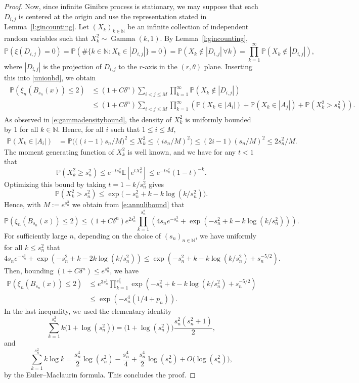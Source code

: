 \documentclass[10pt,a4paper]{amsart}
\def\E{\mathbb E}
\def\P{\mathbb P}
\begin{document}
\begin{proof}
Now, since infinite Ginibre process is stationary, we may suppose that each $D_{i,j}$ is centered at the origin and use the representation  stated in Lemma~\ref{l:gincounting}. Let $(X_k)_{k \in \mathbb{N} }$ be an infinite collection of independent random variables such that $X^2_k\sim \operatorname{Gamma}(k,1)$. By Lemma~\ref{l:gincounting},
\[
\P( \xi ( D_{i,j} ) = 0)  = \P(  \#\{ k \in \mathbb N : X_{k} \in |D_{i,j} | \} =0 ) =  \P (  X_{k} \notin |D_{i,j}| \, \forall k ) =\prod_{k=1}^\infty \P( X_{k} \notin |D_{i,j}|) ,
\]
where $|D_{i,j}|$ is the projection of $D_{i,j}$ to the $r$-axis in the $(r,\theta)$ plane. Inserting this into \eqref{unionbd}, we obtain 
\begin{align}
\begin{split}
\label{e:annulibound}
	\P ( \xi_n ( B_{s_n} (x)) \le 2)
	&\le (1+C\delta^n) \sum_{i < j \le M} 
	\prod_{k=1}^\infty \P( X_{k} \notin |D_{i,j}|)\\
	&\le 
	(1+C\delta^n) \sum_{i < j \le M} 
	\prod_{k=1}^\infty
	\left( \P(X_{k} \in |A_i|) +  \P(X_{k} \in |A_j|) +\P(X^2_{k} > s_n^2) \right).
\end{split}
\end{align}
As observed in \eqref{e:gammadensitybound}, the density of $X^2_{k}$ is uniformly bounded by 1 for all $k \in \mathbb N$. Hence, for all $i$ such that $1 \le i \le M$, 
\begin{align*}
	\P(X_{k}  \in |A_i|)&=\P\Big( \big((i-1)s_n/M\big)^2\le  X^2_{k} \le (is_n/M)^2\Big) \le 
	(2i-1) (s_n/M)^2\le 2s_n^2/M.
\end{align*}
The moment generating function of $X^2_{k}$ is well known, and we have for any $t < 1$ that 
\[
\P( X^2_{k} \ge s_n^2) \le e^{ - t s_n^2} \E [ e^{ t X^2_{k}} ] \le e^{ - t s_n^2}  ( 1 -  t)^{-k}.
\]
Optimizing this bound by taking $t = 1 -  k/s_n^2$ gives 
\[\P(X^2_{k} > s_n^2)\le \exp\big(-s_n^2 +k - k\log ( k/s_n^2)\big).\] 
Hence, with $M:=e^{s_n^3}$ we obtain from \eqref{e:annulibound} that 
\[
\P ( \xi_n ( B_{s_n} (x)) \le 2) \le 
(1+C \delta^n) e^{2 s^3_n} \prod_{k=1}^{s_n^2 } \left ( 4 s_n e^{ - s_n^3}  +  \exp\left(-s_n^2+k-  k\log ( k /s_n^2)\right) \right).
\]
For sufficiently large $n$, depending on the choice of  $(s_n)_{n \in \mathbb N}$, we have  uniformly for all $k \le s_n^2$ that
\[
4 s_n e^{ - s_n^3}  +  \exp\left(-s_n^2+k-2k\log (k /s_n^2)\right) \le  \exp\left(- s_n^2 +k - k\log (k /s_n^2) +s_n^{-5/2}\right).
\]
 Then, bounding $(1 + C \delta^n) \le e^{s_n^3}$, we have 
\begin{align*}
\P ( \xi_n ( B_{s_n} (x)) \le 2) &\le
	e^{3 s^3_n} \prod_{k=1}^{s_n^2} 
	\exp\left(-s_n^2 + k - k\log (k /s_n^2)+s_n^{-5/2}\right) \\
	& \le \exp\left(- s^4_n ( 1/4 + p_n ) \right).
\end{align*}
In the last inequality, we used the elementary identity
\[
\sum_{k=1}^{s_n^2}   k \big(1 +   \log (s^2_n)  \big)  
 =
\big(1 +   \log (s^2_n)  \big)    \frac{ s_n^2  (s_n^2 + 1 ) }{2}, 
\]
and 
\[
\sum_{k=1}^{s_n^2}   k \log k   = \frac{ s_n^4}{2} \log(s_n^2)  - \frac{ s_n^4}{4} + \frac{s_n^4 }{2} \log (s_n^2) + O\big ( \log (s_n^2)\big),
\]
by the Euler--Maclaurin formula. 
This concludes the proof.
\end{proof}
\end{document}
